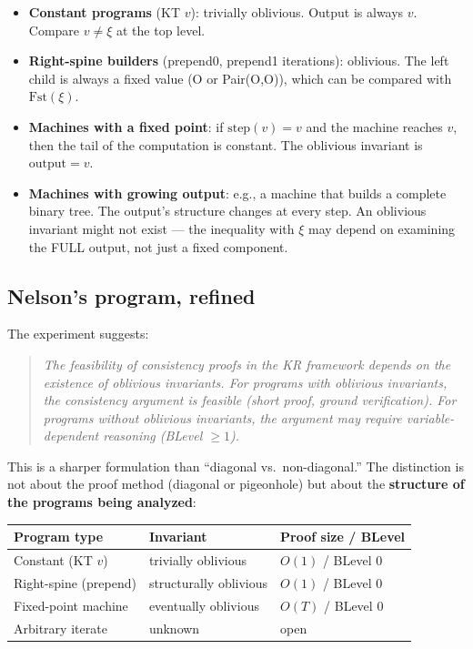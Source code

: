 \documentclass[11pt]{article}
\begin{document}
\begin{itemize}
\item \textbf{Constant programs} (KT $v$): trivially oblivious. Output is always $v$. Compare $v \ne \xi$ at the top level.

\item \textbf{Right-spine builders} (prepend0, prepend1 iterations): oblivious. The left child is always a fixed value (O or Pair(O,O)), which can be compared with $\mathrm{Fst}(\xi)$.

\item \textbf{Machines with a fixed point}: if $\mathrm{step}(v) = v$ and the machine reaches $v$, then the tail of the computation is constant. The oblivious invariant is $\text{output} = v$.

\item \textbf{Machines with growing output}: e.g., a machine that builds a complete binary tree. The output's structure changes at every step. An oblivious invariant might not exist --- the inequality with $\xi$ may depend on examining the FULL output, not just a fixed component.
\end{itemize}

\subsection{Nelson's program, refined}

The experiment suggests:

\begin{quote}
\emph{The feasibility of consistency proofs in the KR framework depends on the existence of oblivious invariants. For programs with oblivious invariants, the consistency argument is feasible (short proof, ground verification). For programs without oblivious invariants, the argument may require variable-dependent reasoning (BLevel $\ge 1$).}
\end{quote}

This is a sharper formulation than ``diagonal vs.\ non-diagonal.'' The distinction is not about the proof method (diagonal or pigeonhole) but about the \textbf{structure of the programs being analyzed}:

\begin{center}
\begin{tabular}{lll}
\toprule
\textbf{Program type} & \textbf{Invariant} & \textbf{Proof size / BLevel} \\
\midrule
Constant (KT $v$) & trivially oblivious & $O(1)$ / BLevel 0 \\
Right-spine (prepend) & structurally oblivious & $O(1)$ / BLevel 0 \\
Fixed-point machine & eventually oblivious & $O(T)$ / BLevel 0 \\
Arbitrary iterate & unknown & open \\
\bottomrule
\end{tabular}
\end{center}
\end{document}
